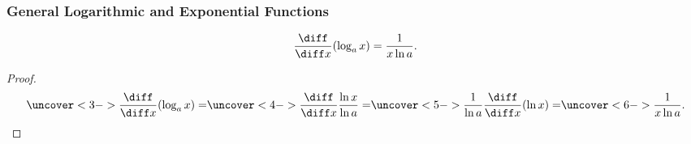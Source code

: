 \begin{frame}
\frametitle{General Logarithmic and Exponential Functions}
\begin{theorem}
\[
\frac{\diff}{\diff x} (\log_a x) = \frac{1}{x\ln a} .
\]
\end{theorem}
\begin{proof}
\[
\uncover<3->{\frac{\diff}{\diff x} (\log_a x) =}%
\uncover<4->{\frac{\diff}{\diff x} \frac{\ln x}{\ln a} = }%
\uncover<5->{\frac{1}{\ln a} \frac{\diff}{\diff x} (\ln x) = }%
\uncover<6->{\frac{1}{x \ln a}.}%
\]
\end{proof}
\end{frame}
